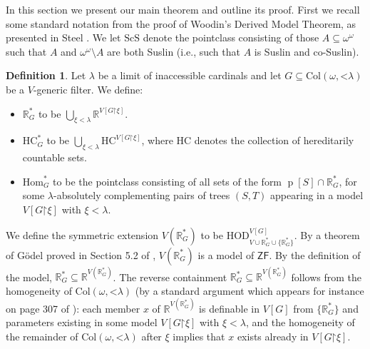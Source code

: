 \documentclass[fleqn, 11pt]{amsart}
\theoremstyle{plain}
\theoremstyle{definition}
\newtheorem{defn}[thm]{Definition} \newtheorem*{defn*}{Definition}
\theoremstyle{remark}
\newcommand{\HOD}{\mathrm{HOD}}
\newcommand{\Hom}{\mathrm{Hom}}
\newcommand{\HC}{\mathrm{HC}}
\newcommand{\ZF}{\mathsf{ZF}}
\newcommand{\Col}{\mathrm{Col}}
\newcommand{\restrict}{\mathord{\restriction}}
\newcommand{\less}{\mathord{<}}
\DeclareMathOperator{\p}{p}
\begin{document}

In this section we present our main theorem and outline its proof. First we recall some standard notation from the proof of Woodin's Derived Model Theorem, as presented in Steel \cite{SteDMT}. %
We let $\mathrm{ScS}$ denote the pointclass consisting of those $A \subseteq \omega^{\omega}$ such that $A$ and $\omega^{\omega} \setminus A$ are both Suslin (i.e., such that $A$ is Suslin and co-Suslin). 

\begin{defn}
 Let $\lambda$ be a limit of inaccessible cardinals and let $G \subseteq \Col(\omega,\mathord{<}\lambda)$ be a $V$-generic filter.  We define:
 \begin{itemize}
  \item $\mathbb{R}^*_G$ to be $\bigcup_{\xi < \lambda} \mathbb{R}^{V[G \restrict \xi]}$.
  \item $\HC^*_G$ to be $\bigcup_{\xi < \lambda} \HC^{V[G \restrict \xi]}$, where $\HC$ denotes the collection of hereditarily countable sets.
  \item $\Hom^*_G$ to be the pointclass consisting of all sets of the form $\p[S] \cap \mathbb{R}^*_G$, for some $\lambda$-absolutely complementing pairs of trees $(S,T)$ appearing in a model $V[G \restrict \xi]$ with $\xi < \lambda$.
 \end{itemize}
\end{defn}

We define the symmetric extension
$V(\mathbb{R}^*_G)$ to be $\HOD_{V \cup \mathbb{R}^*_G \cup \{\mathbb{R}^*_G\}}^{V[G]}$. 
By a theorem of G\"{o}del proved in Section 5.2 of \cite{Schindler:SetTheory}, 
$V(\mathbb{R}^{*}_{G})$ is a model of $\ZF$. 
By the definition of the model, $\mathbb{R}^*_G \subseteq \mathbb{R}^{V(\mathbb{R}^*_G)}$. The reverse containment $\mathbb{R}^{*}_{G} \subseteq \mathbb{R}^{V(\mathbb{R}^{*}_{G})}$ follows from the homogeneity of $\Col(\omega, \less\lambda)$ (by a standard argument which appears for instance on page 307 of \cite{SteDMT}): each member $x$ of $\mathbb{R}^{V(\mathbb{R}^{*}_{G})}$ is definable in $V[G]$ from $\{\mathbb{R}^{*}_{G}\}$ and parameters existing in some model $V[G \restrict \xi]$ with $\xi < \lambda$, and the homogeneity of the remainder of $\Col(\omega, \less\lambda)$ after $\xi$ implies that $x$ exists already in $V[G \restrict \xi]$. 
\end{document}
